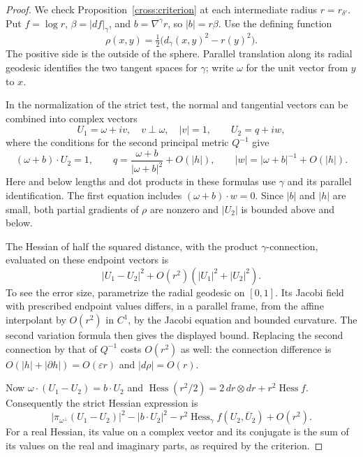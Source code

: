 \documentclass[11pt]{article}
\theoremstyle{definition}
\theoremstyle{remark}
\numberwithin{equation}{section}
\begin{document}
\begin{proof}
We check Proposition~\ref{cross:criterion} at each intermediate radius
$r=r_{\delta'}$.  Put $f=\log r$, $\beta=|df|_\gamma$, and
$b=\nabla^\gamma r$, so $|b|=r\beta$.  Use the defining function
\[
 \rho(x,y)=\tfrac12\bigl(d_\gamma(x,y)^2-r(y)^2\bigr).
\]
The positive side is the outside of the sphere.  Parallel translation
along its radial geodesic identifies the two tangent spaces for
$\gamma$; write $\omega$ for the unit vector from $y$ to $x$.

In the normalization of the strict test, the normal and tangential
vectors can be combined into complex vectors
\[
 U_1=\omega+i v,\quad v\perp\omega,\quad |v|=1,
 \qquad U_2=q+i w,
\]
where the conditions for the second principal metric $Q^{-1}$ give
\begin{equation}\label{balls:test-vectors}
 (\omega+b)\cdot U_2=1,\qquad
 q=\frac{\omega+b}{|\omega+b|^2}+O(|h|),\qquad
 |w|=|\omega+b|^{-1}+O(|h|).
\end{equation}
Here and below lengths and dot products in these formulas use $\gamma$
and its parallel identification.  The first equation includes
$(\omega+b)\cdot w=0$.  Since $|b|$ and $|h|$ are small, both partial
gradients of $\rho$ are nonzero and $|U_2|$ is bounded above and below.

The Hessian of half the squared distance, with the product
$\gamma$-connection, evaluated on these endpoint vectors is
\[
 |U_1-U_2|^2+O(r^2)(|U_1|^2+|U_2|^2).
\]
To see the error size, parametrize the radial geodesic on $[0,1]$.
Its Jacobi field with prescribed endpoint values differs, in a parallel
frame, from the affine interpolant by $O(r^2)$ in $C^1$, by the Jacobi
equation and bounded curvature.  The second variation formula then gives
the displayed bound.  Replacing the second connection by that of
$Q^{-1}$ costs $O(r^2)$ as well: the connection difference is
$O(|h|+|\partial h|)=O(\varepsilon r)$ and $|d\rho|=O(r)$.

Now
$\omega\cdot(U_1-U_2)=b\cdot U_2$ and
$\operatorname{Hess}(r^2/2)=2\,dr\otimes dr+r^2\operatorname{Hess}f$.
Consequently the strict Hessian expression is
\begin{equation}\label{balls:test-expression}
 |\pi_{\omega^\perp}(U_1-U_2)|^2-|b\cdot U_2|^2
      -r^2\operatorname{Hess}_\gamma f(U_2,\overline U_2)+O(r^2).
\end{equation}
For a real Hessian, its value on a complex vector and its conjugate is
the sum of its values on the real and imaginary parts, as required by
the criterion.


\end{proof}
\end{document}
